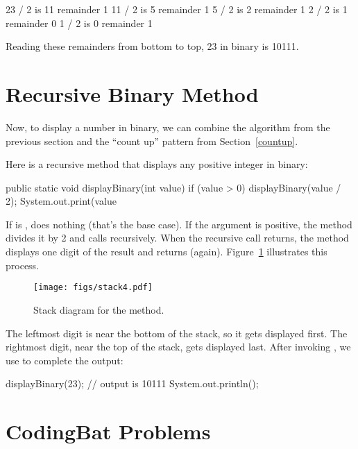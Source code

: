 \begin{stdout}
23 / 2 is 11 remainder 1
11 / 2 is  5 remainder 1
 5 / 2 is  2 remainder 1
 2 / 2 is  1 remainder 0
 1 / 2 is  0 remainder 1
\end{stdout}

Reading these remainders from bottom to top, 23 in binary is 10111.


\section{Recursive Binary Method}

Now, to display a number in binary, we can combine the algorithm from the previous section and the ``count up'' pattern from Section~\ref{countup}.

Here is a recursive method that displays any positive integer in binary:

\begin{code}
public static void displayBinary(int value) {
    if (value > 0) {
        displayBinary(value / 2);
        System.out.print(value %
    }
}
\end{code}

If  is ,  does nothing (that's the base case).
If the argument is positive, the method divides it by 2 and calls  recursively.
When the recursive call returns, the method displays one digit of the result and returns (again).
Figure~\ref{fig.stack4} illustrates this process.


\begin{figure}[!ht]
\begin{center}
\texttt{[image: figs/stack4.pdf]}
\caption{Stack diagram for the  method.}
\label{fig.stack4}
\end{center}
\end{figure}

The leftmost digit is near the bottom of the stack, so it gets displayed first.
The rightmost digit, near the top of the stack, gets displayed last.
After invoking , we use  to complete the output:

\begin{code}
displayBinary(23);      // output is 10111
System.out.println();
\end{code}


\section{CodingBat Problems}

